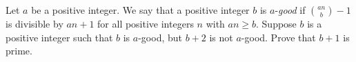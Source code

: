 Let $a$ be a positive integer. We say that a positive integer $b$ is $a$-\emph{good} if $\binom{an}{b}-1$ is divisible by $an+1$ for all positive integers $n$ with $an\geq b$. Suppose $b$ is a positive integer such that $b$ is $a$-good, but $b+2$ is not $a$-good. Prove that $b+1$ is prime.
